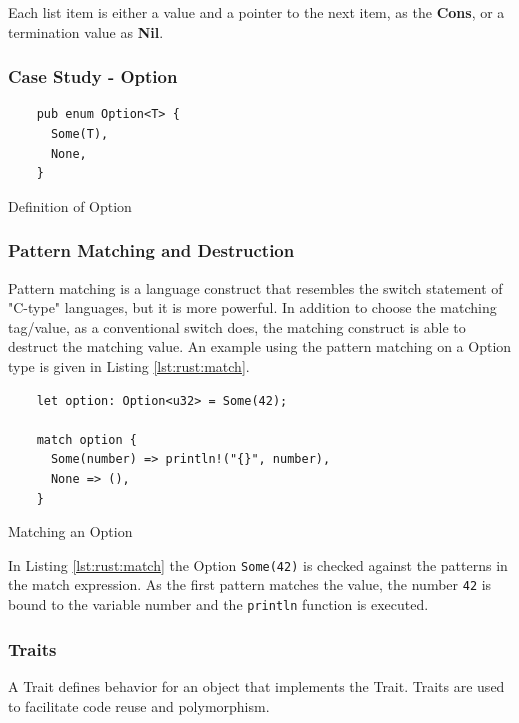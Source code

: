 Each list item is either a value and a pointer to the next item, as the \textbf{Cons}, or a termination value as \textbf{Nil}.

\subsubsection{Case Study - Option}

\begin{listing}[H]
  \begin{verbatim}
    pub enum Option<T> {
      Some(T),
      None,
    }
  \end{verbatim}
  \caption{Definition of Option}
  \label{lst:rust:option}
\end{listing}

\subsubsection{Pattern Matching and Destruction}

Pattern matching is a language construct that resembles the switch statement of "C-type" languages, but it is more powerful.
In addition to choose the matching tag/value, as a conventional switch does, the matching construct is able to destruct the matching value.
An example using the pattern matching on a Option type is given in Listing \ref{lst:rust:match}.

\begin{listing}[H]
  \begin{verbatim}
    let option: Option<u32> = Some(42);

    match option {
      Some(number) => println!("{}", number),
      None => (),
    }
  \end{verbatim}
  \caption{Matching an Option}
  \label{lst:rust:match}
\end{listing}

In Listing \ref{lst:rust:match} the Option \texttt{Some(42)} is checked against the patterns in the match expression.
As the first pattern matches the value, the number \texttt{42} is bound to the variable number and the \texttt{println} function is executed.

\subsubsection{Traits}

A Trait defines behavior for an object that implements the Trait.
Traits are used to facilitate code reuse and polymorphism.


